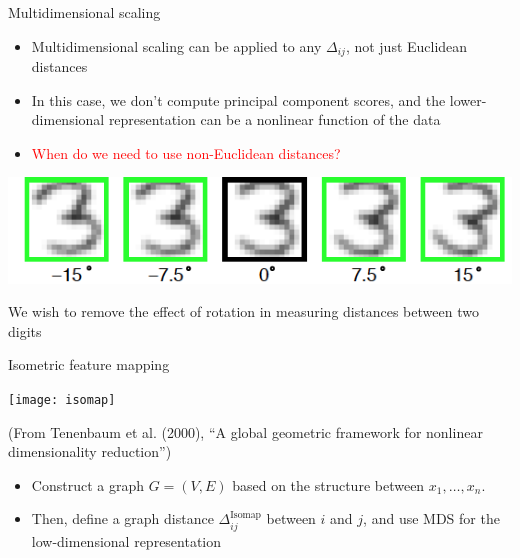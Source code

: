 \documentclass[14pt]{beamer}
\begin{document}
\begin{frame}{Multidimensional scaling}

\begin{itemize}
\item Multidimensional scaling can be applied to any $\Delta_{ij}$, not just Euclidean distances
\item In this case, we don't compute principal component scores, and the lower-dimensional representation can be a nonlinear function of the data 
\item \textcolor{red}{When do we need to use non-Euclidean distances?}
\end{itemize}
\pause
\centerline{\includegraphics[width=.6\textwidth]{digits}}
We wish to remove the effect of rotation in measuring distances between two digits





\end{frame}

\begin{frame}{Isometric feature mapping}



\texttt{[image: isomap]}

{\small (From Tenenbaum et al. (2000), ``A global geometric framework for nonlinear dimensionality reduction'')}

\begin{itemize}
\item Construct a graph $G = (V, E)$ based on the structure between $x_1, \dots, x_n$.
\item Then, define a graph distance $\Delta_{ij}^{\text{Isomap}}$ between $i$ and $j$, and use MDS for the low-dimensional representation
\end{itemize}



\end{frame}
\end{document}
